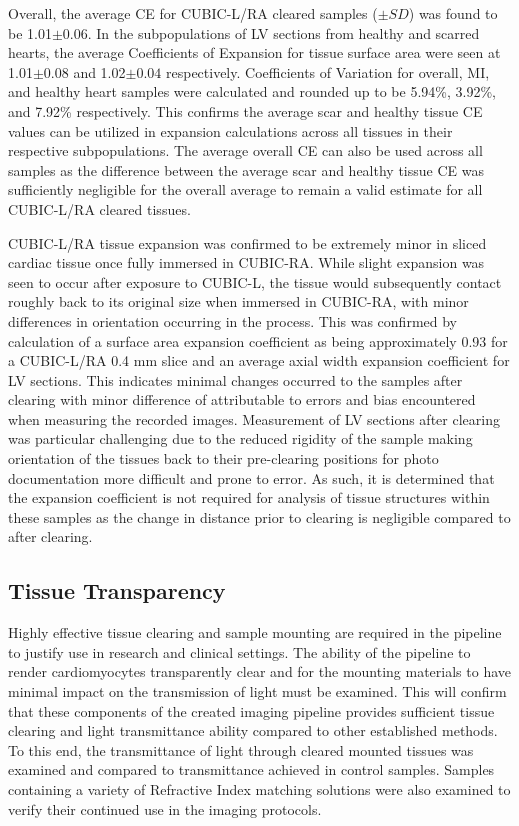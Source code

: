 Overall, the average CE for CUBIC-L/RA cleared samples ($\pm {SD}$) was found to be 1.01$\pm {0.06}$. In the subpopulations of LV sections from healthy and scarred hearts, the average Coefficients of Expansion for tissue surface area were seen at 1.01\(\pm {0.08}\) and 1.02\(\pm {0.04}\) respectively. Coefficients of Variation for overall, MI, and healthy heart samples were calculated and rounded up to be 5.94\%, 3.92\%, and 7.92\% respectively. This confirms the average scar and healthy tissue CE values can be utilized in expansion calculations across all tissues in their respective subpopulations. The average overall CE can also be used across all samples as the difference between the average scar and healthy tissue CE was sufficiently negligible for the overall average to remain a valid estimate for all CUBIC-L/RA cleared tissues.

CUBIC-L/RA tissue expansion was confirmed to be extremely minor in sliced cardiac tissue once fully immersed in CUBIC-RA. While slight expansion was seen to occur after exposure to CUBIC-L, the tissue would subsequently contact roughly back to its original size when immersed in CUBIC-RA, with minor differences in orientation occurring in the process. This was confirmed by calculation of a surface area expansion coefficient as being approximately 0.93 for a CUBIC-L/RA 0.4 mm slice and an average axial width expansion coefficient for LV sections. This indicates minimal changes occurred to the samples after clearing with minor difference of attributable to errors and bias encountered when measuring the recorded images. Measurement of LV sections after clearing was particular challenging due to the reduced rigidity of the sample making orientation of the tissues back to their pre-clearing positions for photo documentation more difficult and prone to error. As such, it is determined that the expansion coefficient is not required for analysis of tissue structures within these samples as the change in distance prior to clearing is negligible compared to after clearing.

\subsection{Tissue Transparency}

Highly effective tissue clearing and sample mounting are required in the pipeline to justify use in research and clinical settings. The ability of the pipeline to render cardiomyocytes transparently clear and for the mounting materials to have minimal impact on the transmission of light must be examined. This will confirm that these components of the created imaging pipeline provides sufficient tissue clearing and light transmittance ability compared to other established methods. To this end, the transmittance of light through cleared mounted tissues was examined and compared to transmittance achieved in control samples. Samples containing a variety of Refractive Index matching solutions were also examined to verify their continued use in the imaging protocols. 

